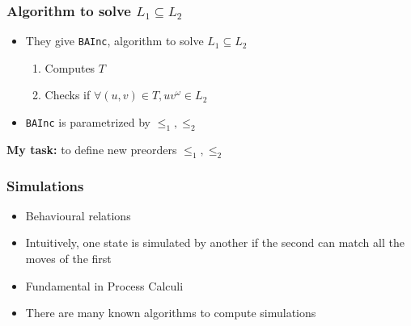 \documentclass{beamer}
\begin{document}
\begin{frame}
\frametitle{Algorithm to solve $L_1 \subseteq L_2$}
\begin{itemize}
\item They give \texttt{BAInc}, algorithm to solve $L_1 \subseteq L_2$
    \begin{enumerate}
    \item Computes $T$
    \item Checks if $\forall (u,v) \in T, uv ^{\omega} \in L_2$
    \end{enumerate}
\item \texttt{BAInc} is parametrized by $\leq_1, \leq_2$
\end{itemize}

\begin{figure}[h]
\centering
{}
\end{figure}

\pause
\textbf{My task:} to define new preorders $\leq_1, \leq_2$
\end{frame}

\begin{frame}
\frametitle{Simulations}
\begin{itemize}
\item Behavioural relations
\item Intuitively, one state is simulated by another if the second can match all the moves of the first
\item Fundamental in Process Calculi
\item There are many known algorithms to compute simulations
\end{itemize}
\end{frame}
\end{document}

